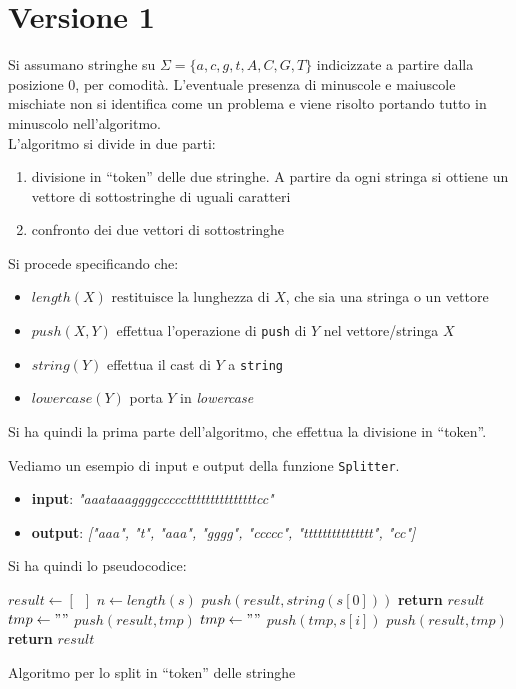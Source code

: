 \documentclass[a4paper,12pt, oneside]{book}
\begin{document}
\section{Versione 1}
Si assumano stringhe su $\Sigma=\{a,c,g,t,A,C,G,T\}$ indicizzate a partire dalla
posizione 0, per comodità. L'eventuale presenza di minuscole e maiuscole
mischiate non si identifica come un problema e viene risolto portando tutto in
minuscolo nell'algoritmo.\\
L'algoritmo si divide in due parti:
\begin{enumerate}
  \item divisione in ``token'' delle due stringhe. A partire da ogni stringa si
  ottiene un vettore di sottostringhe di uguali caratteri
  \item confronto dei due vettori di sottostringhe
\end{enumerate}
Si procede specificando che:
\begin{itemize}
  \item $length(X)$ restituisce la lunghezza di $X$, che sia una stringa o un
  vettore 
  \item $push(X,Y)$ effettua l'operazione di \texttt{push} di $Y$ nel
  vettore/stringa $X$
  \item $string(Y)$ effettua il cast di $Y$ a \texttt{string}
  \item $lowercase(Y)$ porta $Y$ in \textit{lowercase}
\end{itemize}
Si ha quindi la prima parte dell'algoritmo, che effettua la divisione in
``token''.
\newpage
\begin{esempio}
  Vediamo un esempio di input e output della funzione \texttt{Splitter}.
  \begin{itemize}
    \item \textbf{input}: \textit{"aaataaaggggccccctttttttttttttttcc"}
    \item \textbf{output}: \textit{["aaa", "t", "aaa", "gggg", "ccccc",
      "ttttttttttttttt", "cc"]} 
  \end{itemize}
\end{esempio}
Si ha quindi lo pseudocodice:
\begin{algorithm}[H]
  \begin{algorithmic}[1]
    \State $result \gets \left[\,\,\,\right]$
    \State $n\gets length(s)$
    \State $push(result, string(s[0]))$
    \State \textbf{return} $result$
    \EndIf
    \State $tmp \gets ""$
    \State $push(result, tmp)$
    \State $tmp \gets ""$
    \EndIf
    \State $push(tmp, s[i])$
    \State $push(result, tmp)$
    \EndIf
    \EndFor
    \State \textbf{return} $result$
    \EndFunction
  \end{algorithmic}
  \caption{Algoritmo per lo split in ``token'' delle stringhe}
\end{algorithm}
\end{document}
